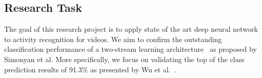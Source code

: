 \subsection{Research Task}
The goal of this research project is to apply state of the art deep neural network to activity recognition for videos.
We aim to confirm the outstanding classification performance of a two-stream learning architecture~\cite{simonyan2014two} as proposed by Simonyan et al.
More specifically, we focus on validating the top of the class prediction results of 91.3\% as presented by Wu et al.~\cite{wu2015modeling}.
